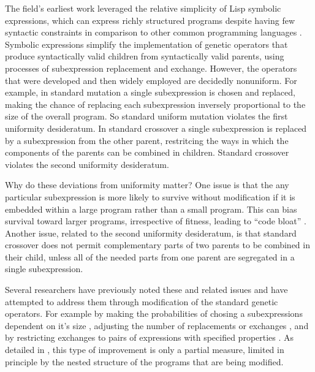 \documentclass[graybox]{svmult}
\begin{document}
The field's earliest work leveraged the relative simplicity of Lisp symbolic expressions, which can express richly structured programs despite having few syntactic constraints in comparison to other common programming languages \cite{koza:book}. Symbolic expressions simplify the implementation of genetic operators that produce syntactically valid children from syntactically valid parents, using processes of subexpression replacement and exchange. However, the operators that were developed and then widely employed are decidedly nonuniform. For example, in standard mutation a single subexpression is chosen and replaced, making the chance of replacing each subexpression inversely proportional to the size of the overall program. So standard uniform mutation violates the first uniformity desideratum. In standard crossover a single subexpression is replaced by a subexpression from the other parent, restritcing the ways in which the components of the parents can be combined in children. Standard crossover violates the second uniformity desideratum.

Why do these deviations from uniformity matter? One issue is that the any particular subexpression is more likely to survive without modification if it is embedded within a large program rather than a small program. This can bias survival toward larger programs, irrespective of fitness, leading to ``code bloat'' \cite{Luke:2006:EC:FIXED}. Another issue, related to the second uniformity desideratum, is that standard crossover does not permit complementary parts of two parents to be combined in their child, unless all of the needed parts from one parent are segregated in a single subexpression.

Several researchers have previously noted these and related issues and have attempted to address them through modification of the standard genetic operators. For example by making the probabilities of chosing a subexpressions dependent on it's size \cite{koza:book,Helmuth:2011:GECCOcomp}, adjusting the number of replacements or exchanges \cite{vanbelle:2002:EuroGP:NOERROR}, and by restricting exchanges to pairs of expressions with specified properties \cite{page:CSRP-98-20,poli:1998:local,poli:2000:22par}. As detailed in \cite{Spector:2013:GPTP}, this type of improvement is only a partial measure, limited in principle by the nested structure of the programs that are being modified.
\end{document}
